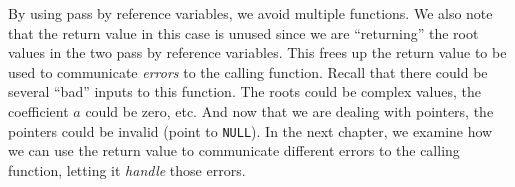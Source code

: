 By using pass by reference variables, we avoid multiple functions.
We also note that the return value in this case is unused since
we are ``returning'' the root values in the two pass by reference
variables.  This frees up the return value to be used to communicate
\emph{errors} to the calling function.  Recall that there could
be several ``bad'' inputs to this function.  The roots could be complex
values, the coefficient $a$ could be zero, etc.  And now that we
are dealing with pointers, the pointers could be invalid (point to
\texttt{NULL}).  In the next chapter, we examine how we
can use the return value to communicate different errors to the
calling function, letting it \emph{handle} those errors.







